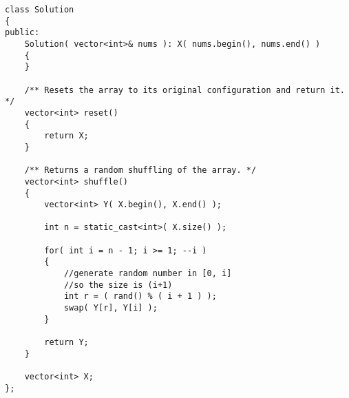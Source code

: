 \setcounter{lstlisting}{0}
\begin{lstlisting}[style=customc, caption={Fisher–Yates shuffle}]
class Solution
{
public:
    Solution( vector<int>& nums ): X( nums.begin(), nums.end() )
    {
    }

    /** Resets the array to its original configuration and return it. */
    vector<int> reset()
    {
        return X;
    }

    /** Returns a random shuffling of the array. */
    vector<int> shuffle()
    {
        vector<int> Y( X.begin(), X.end() );

        int n = static_cast<int>( X.size() );

        for( int i = n - 1; i >= 1; --i )
        {
            //generate random number in [0, i]
            //so the size is (i+1)
            int r = ( rand() % ( i + 1 ) );
            swap( Y[r], Y[i] );
        }

        return Y;
    }

    vector<int> X;
};

\end{lstlisting}